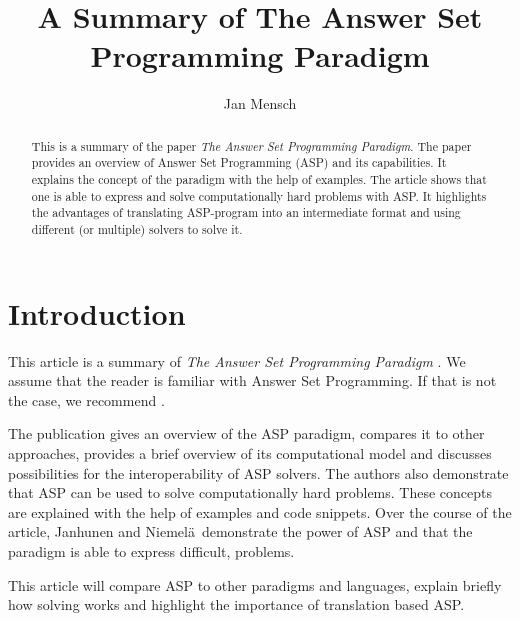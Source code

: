 \documentclass[runningheads]{llncs}
\newcommand{\papertitle}{The Answer Set Programming Paradigm}
\newcommand{\authorquote}{Janhunen and Niemelä~}
\begin{document}
\title{A Summary of \papertitle}

\author{Jan Mensch}




%
\maketitle              %
%
\begin{abstract}
This is a summary of the paper \textit{\papertitle}. The paper provides an overview of Answer Set Programming (ASP) and its capabilities. It explains the concept of the paradigm with the help of examples. The article shows that one is able to express and solve computationally hard problems with ASP. It highlights the advantages of translating ASP-program into an intermediate format and using different (or multiple) solvers to solve it.



\end{abstract}

\section{Introduction}
This article is a summary of \textit{\papertitle} \cite{janhunen2016answer}. We assume that the reader is familiar with Answer Set Programming. If that is not the case, we recommend \cite{erdem2016applications}. 

The publication gives an overview of the ASP paradigm, compares it to other approaches, provides a brief overview of its computational model and discusses possibilities for the interoperability of ASP solvers. The authors also demonstrate that ASP can be used to solve computationally hard problems. These concepts are explained with the help of examples and code snippets. Over the course of the article, \authorquote demonstrate the power of ASP and that the paradigm is able to express difficult,  problems. 

This article will compare ASP to other paradigms and languages, explain briefly how solving works and highlight the importance of translation based ASP. 

\end{document}
